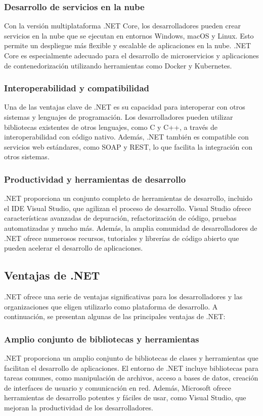 \documentclass[executivepaper]{article}
\begin{document}
\subsubsection*{Desarrollo de servicios en la nube}
Con la versión multiplataforma .NET Core, los desarrolladores pueden crear servicios en la nube que se ejecutan en entornos Windows, macOS y Linux. Esto permite un despliegue más flexible y escalable de aplicaciones en la nube. .NET Core es especialmente adecuado para el desarrollo de microservicios y aplicaciones de contenedorización utilizando herramientas como Docker y Kubernetes.

\subsubsection*{Interoperabilidad y compatibilidad}
Una de las ventajas clave de .NET es su capacidad para interoperar con otros sistemas y lenguajes de programación. Los desarrolladores pueden utilizar bibliotecas existentes de otros lenguajes, como C y C++, a través de interoperabilidad con código nativo. Además, .NET también es compatible con servicios web estándares, como SOAP y REST, lo que facilita la integración con otros sistemas.

\subsubsection*{Productividad y herramientas de desarrollo}
.NET proporciona un conjunto completo de herramientas de desarrollo, incluido el IDE Visual Studio, que agilizan el proceso de desarrollo. Visual Studio ofrece características avanzadas de depuración, refactorización de código, pruebas automatizadas y mucho más. Además, la amplia comunidad de desarrolladores de .NET ofrece numerosos recursos, tutoriales y librerías de código abierto que pueden acelerar el desarrollo de aplicaciones.

\subsection{Ventajas de .NET}

.NET ofrece una serie de ventajas significativas para los desarrolladores y las organizaciones que eligen utilizarlo como plataforma de desarrollo. A continuación, se presentan algunas de las principales ventajas de .NET:

\subsubsection*{Amplio conjunto de bibliotecas y herramientas}
.NET proporciona un amplio conjunto de bibliotecas de clases y herramientas que facilitan el desarrollo de aplicaciones. El entorno de .NET incluye bibliotecas para tareas comunes, como manipulación de archivos, acceso a bases de datos, creación de interfaces de usuario y comunicación en red. Además, Microsoft ofrece herramientas de desarrollo potentes y fáciles de usar, como Visual Studio, que mejoran la productividad de los desarrolladores.
\end{document}
